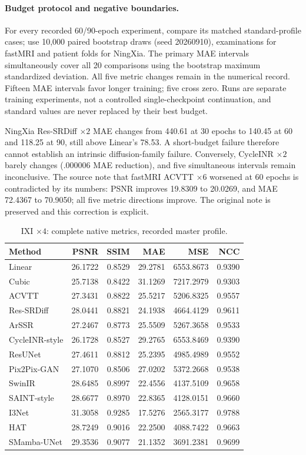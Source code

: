 \paragraph{Budget protocol and negative boundaries.}
For every recorded 60/90-epoch experiment, compare its matched standard-profile cases; use 10,000 paired bootstrap draws (seed 20260910), examinations for fastMRI and patient folds for NingXia. The primary MAE intervals simultaneously cover all 20 comparisons using the bootstrap maximum standardized deviation. All five metric changes remain in the numerical record. Fifteen MAE intervals favor longer training; five cross zero. Runs are separate training experiments, not a controlled single-checkpoint continuation, and standard values are never replaced by their best budget.

NingXia Res-SRDiff $\times2$ MAE changes from 440.61 at 30 epochs to 140.45 at 60 and 118.25 at 90, still above Linear's 78.53. A short-budget failure therefore cannot establish an intrinsic diffusion-family failure. Conversely, CycleINR $\times2$ barely changes (.000006 MAE reduction), and five simultaneous intervals remain inconclusive. The source note that fastMRI ACVTT $\times6$ worsened at 60 epochs is contradicted by its numbers: PSNR improves 19.8309 to 20.0269, and MAE 72.4367 to 70.9050; all five metric directions improve. The original note is preserved and this correction is explicit.
\begin{table}[t]\centering\small
\caption{IXI $\times4$: complete native metrics, recorded master profile.}
\begin{tabular}{lrrrrr}\toprule Method&PSNR&SSIM&MAE&MSE&NCC\\\midrule
Linear & 26.1722 & 0.8529 & 29.2781 & 6553.8673 & 0.9390\\
Cubic & 25.7138 & 0.8422 & 31.1269 & 7217.2979 & 0.9303\\
ACVTT & 27.3431 & 0.8822 & 25.5217 & 5206.8325 & 0.9557\\
Res-SRDiff & 28.0441 & 0.8821 & 24.1938 & 4664.4129 & 0.9611\\
ArSSR & 27.2467 & 0.8773 & 25.5509 & 5267.3658 & 0.9533\\
CycleINR-style & 26.1728 & 0.8527 & 29.2765 & 6553.8469 & 0.9390\\
ResUNet & 27.4611 & 0.8812 & 25.2395 & 4985.4989 & 0.9552\\
Pix2Pix-GAN & 27.1070 & 0.8506 & 27.0202 & 5372.2668 & 0.9538\\
SwinIR & 28.6485 & 0.8997 & 22.4556 & 4137.5109 & 0.9658\\
SAINT-style & 28.6677 & 0.8970 & 22.8365 & 4128.0151 & 0.9660\\
I3Net & 31.3058 & 0.9285 & 17.5276 & 2565.3177 & 0.9788\\
HAT & 28.7249 & 0.9016 & 22.2500 & 4088.7422 & 0.9663\\
SMamba-UNet & 29.3536 & 0.9077 & 21.1352 & 3691.2381 & 0.9699\\
\bottomrule\end{tabular}\end{table}
